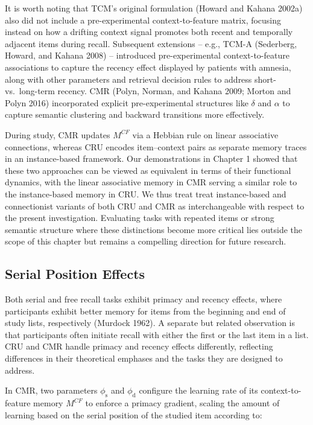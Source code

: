 \documentclass[
  letterpaper,
  11pt,
  english,
  singlespacing,
  headsepline]{MastersDoctoralThesis}
\begin{document}
It is worth noting that TCM's original formulation (Howard and Kahana
2002a) also did not include a pre-experimental context-to-feature
matrix, focusing instead on how a drifting context signal promotes both
recent and temporally adjacent items during recall. Subsequent
extensions -- e.g., TCM-A (Sederberg, Howard, and Kahana 2008) --
introduced pre-experimental context-to-feature associations to capture
the recency effect displayed by patients with amnesia, along with other
parameters and retrieval decision rules to address short- vs.~long-term
recency. CMR (Polyn, Norman, and Kahana 2009; Morton and Polyn 2016)
incorporated explicit pre-experimental structures like \(\delta\) and
\(\alpha\) to capture semantic clustering and backward transitions more
effectively.

During study, CMR updates \(M^{CF}\) via a Hebbian rule on linear
associative connections, whereas CRU encodes item--context pairs as
separate memory traces in an instance-based framework. Our
demonstrations in Chapter 1 showed that these two approaches can be
viewed as equivalent in terms of their functional dynamics, with the
linear associative memory in CMR serving a similar role to the
instance-based memory in CRU. We thus treat treat instance-based and
connectionist variants of both CRU and CMR as interchangeable with
respect to the present investigation. Evaluating tasks with repeated
items or strong semantic structure where these distinctions become more
critical lies outside the scope of this chapter but remains a compelling
direction for future research.

\subsection{Serial Position Effects}\label{serial-position-effects}

Both serial and free recall tasks exhibit primacy and recency effects,
where participants exhibit better memory for items from the beginning
and end of study lists, respectively (Murdock 1962). A separate but
related observation is that participants often initiate recall with
either the first or the last item in a list. CRU and CMR handle primacy
and recency effects differently, reflecting differences in their
theoretical emphases and the tasks they are designed to address.

In CMR, two parameters \(\phi_\text{s}\) and \(\phi_\text{d}\) configure
the learning rate of its context-to-feature memory \(M^{CF}\) to enforce
a primacy gradient, scaling the amount of learning based on the serial
position of the studied item according to:
\end{document}
